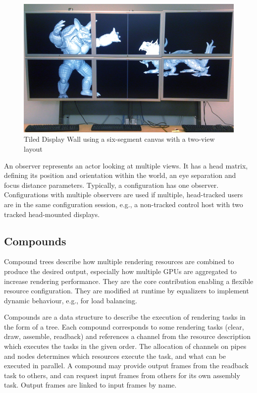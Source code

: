 \begin{figure}[t]\center
 \includegraphics[width=\textwidth]{images/wallLayout.jpg}
 {\caption{\label{fDisplay}Tiled Display Wall using a six-segment canvas with a two-view layout}}
\end{figure}

An \textsf{observer} represents an actor looking at multiple views. It has a
head matrix, defining its position and orientation within the world, an eye
separation and focus distance parameters. Typically, a configuration has one
observer. Configurations with multiple observers are used if multiple,
head-tracked users are in the same configuration session, e.g., a non-tracked
control host with two tracked head-mounted displays.

\subsection{Compounds}

Compound trees describe how multiple rendering resources are combined to
produce the desired output, especially how multiple GPUs are aggregated to
increase rendering performance. They are the core contribution enabling a
flexible resource configuration. They are modified at runtime by
\textsf{equalizers} to implement dynamic behaviour, e.g., for load balancing.

Compounds are a data structure to describe the execution of rendering tasks in
the form of a tree. Each compound corresponds to some rendering tasks (clear,
draw, assemble, readback) and references a channel from the resource
description which executes the tasks in the given order. The allocation of
channels on pipes and nodes determines which resources execute the task, and
what can be executed in parallel. A compound may provide output frames from the
readback task to others, and can request input frames from others for its own
assembly task. Output frames are linked to input frames by name.

